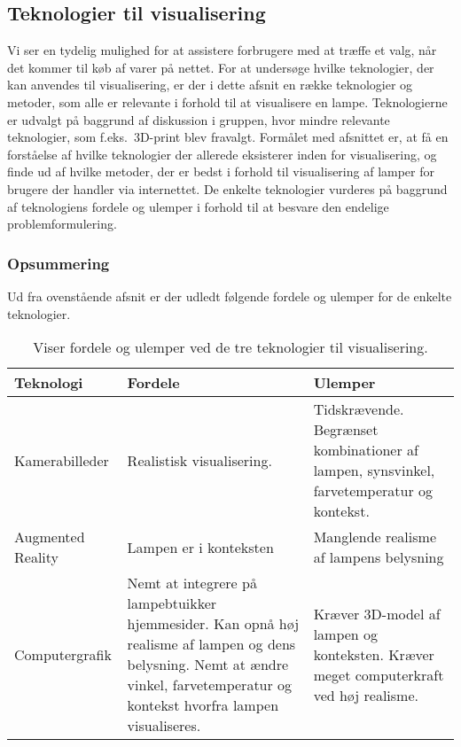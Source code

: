 \subsection{Teknologier til visualisering}
\label{sec:tek_til_visualisering}
Vi ser en tydelig mulighed for at assistere forbrugere med at træffe et valg, når det kommer til køb af varer på nettet. For at undersøge hvilke teknologier, der kan anvendes til visualisering, er der i dette afsnit en række teknologier og metoder, som alle er relevante i forhold til at visualisere en lampe. Teknologierne er udvalgt på baggrund af diskussion i gruppen, hvor mindre relevante teknologier, som f.eks.\ 3D-print blev fravalgt. Formålet med afsnittet er, at få en forståelse af hvilke teknologier der allerede eksisterer inden for visualisering, og finde ud af hvilke metoder, der er bedst i forhold til visualisering af lamper for brugere der handler via internettet. De enkelte teknologier vurderes på baggrund af teknologiens fordele og ulemper i forhold til at besvare den endelige problemformulering.







\subsubsection*{Opsummering}
Ud fra ovenstående afsnit er der udledt følgende fordele og ulemper for de enkelte teknologier.
\begin{table}[H]
  \centering
  
\center
    \begin{tabular}{ | p{3cm} | p{5cm} | p{5cm} |}
    
    \hline
    Teknologi & Fordele & Ulemper \\ \hline
    Kamerabilleder & Realistisk visualisering. & Tidskrævende. Begrænset kombinationer af lampen, synsvinkel, farvetemperatur og kontekst. \\ \hline
    Augmented Reality & Lampen er i konteksten & Manglende realisme af lampens belysning \\ \hline
   Computergrafik & Nemt at integrere på lampebtuikker hjemmesider. Kan opnå høj realisme af lampen og dens belysning. \newline Nemt at ændre vinkel, farvetemperatur og kontekst hvorfra lampen visualiseres. & Kræver 3D-model af lampen og konteksten. Kræver meget computerkraft ved høj realisme. \\ \hline
    \end{tabular}
  \caption{Viser fordele og ulemper ved de tre teknologier til visualisering.}
\label{tab:fordele_ulemper_teknologier}
\end{table}

